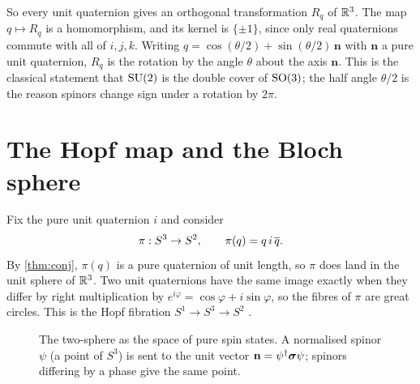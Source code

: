 So every unit quaternion gives an orthogonal transformation $R_q$ of $\mathbb{R}^3$. The map $q\mapsto R_q$ is a homomorphism, and its kernel is $\{\pm1\}$, since only real quaternions commute with all of $i,j,k$. Writing $q=\cos(\theta/2)+\sin(\theta/2)\,\mathbf n$ with $\mathbf n$ a pure unit quaternion, $R_q$ is the rotation by the angle $\theta$ about the axis $\mathbf n$. This is the classical statement that $\mathrm{SU}(2)$ is the double cover of $\mathrm{SO}(3)$; the half angle $\theta/2$ is the reason spinors change sign under a rotation by $2\pi$.

\section{The Hopf map and the Bloch sphere}

Fix the pure unit quaternion $i$ and consider
\begin{equation}\label{eq:hopf}
\pi:S^3\to S^2,\qquad \pi(q)=q\,i\,\overline{q} .
\end{equation}
By \cref{thm:conj}, $\pi(q)$ is a pure quaternion of unit length, so $\pi$ does land in the unit sphere of $\mathbb{R}^3$. Two unit quaternions have the same image exactly when they differ by right multiplication by $e^{i\varphi}=\cos\varphi+i\sin\varphi$, so the fibres of $\pi$ are great circles. This is the Hopf fibration $S^1\to S^3\to S^2$ \cite{Hopf1931}.

\begin{figure}[t]
\centering
{}
\caption{The two-sphere as the space of pure spin states. A normalised spinor $\psi$ (a point of $S^3$) is sent to the unit vector $\mathbf n=\psi^\dagger\boldsymbol{\sigma}\psi$; spinors differing by a phase give the same point.}
\label{fig:bloch}
\end{figure}

